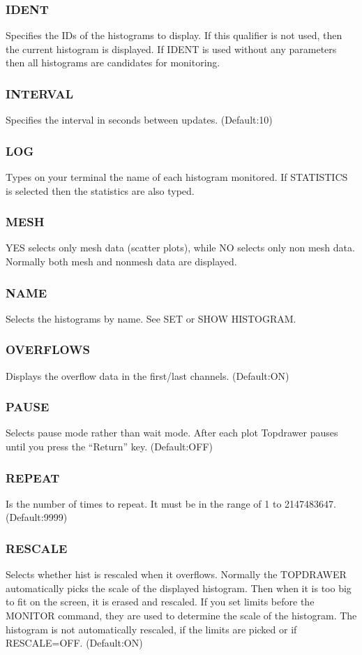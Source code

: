 \subsubsection{IDENT}
Specifies the IDs of the histograms to display.  If this qualifier is
not used, then the current histogram is displayed.  If IDENT is used
without any parameters then all histograms are candidates for
monitoring.  
\subsubsection{INTERVAL}
Specifies the interval in seconds between updates.  
(Default:10) 
\subsubsection{LOG}
Types on your terminal the name of each histogram monitored.  If
STATISTICS is selected then the statistics are also typed.  
\subsubsection{MESH}
YES selects only mesh data (scatter plots), while NO selects only non
mesh data.  Normally both mesh and nonmesh data are displayed.  
\subsubsection{NAME}
Selects the histograms by name.  See SET or SHOW HISTOGRAM.  
\subsubsection{OVERFLOWS}
Displays the overflow data in the first/last channels.  
(Default:ON) 
\subsubsection{PAUSE}
Selects pause mode rather than wait mode.  After each plot Topdrawer
pauses until you press the ``Return'' key.  
(Default:OFF) 
\subsubsection{REPEAT}
Is the number of times to repeat.  It must be in the range of 1 to
2147483647.  
(Default:9999) 
\subsubsection{RESCALE}
Selects whether hist is rescaled when it overflows.  Normally the
TOPDRAWER automatically picks the scale of the displayed histogram.
Then when it is too big to fit on the screen, it is erased and
rescaled.  If you set limits before the MONITOR command, they are used
to determine the scale of the histogram.  The histogram is not
automatically rescaled, if the limits are picked or if RESCALE=OFF.  
(Default:ON) 

